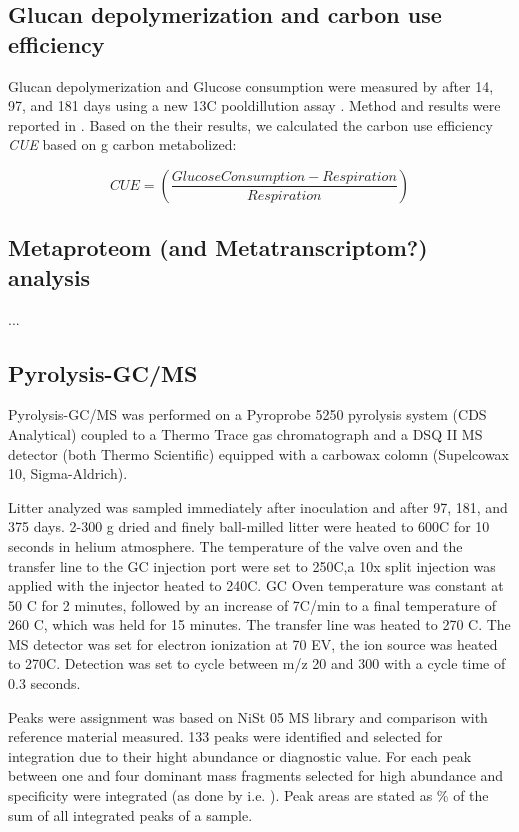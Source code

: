 \subsection{Glucan depolymerization and carbon use efficiency}
Glucan depolymerization and Glucose consumption were measured by \cite{Leitner2011} after 14, 97, and 181 days using a new 13C pooldillution assay . Method and results were reported in \cite{Leitner2011}. Based on the their results, we calculated the carbon use efficiency \emph{CUE} based on g carbon metabolized:

\begin{equation}
CUE = (\frac{Glucose Consumption - Respiration}{Respiration})
\end{equation}

\subsection{Metaproteom (and Metatranscriptom?) analysis}
...

\subsection{Pyrolysis-GC/MS}
Pyrolysis-GC/MS was performed on a Pyroprobe 5250 pyrolysis system (CDS Analytical) coupled to a Thermo Trace gas chromatograph and a DSQ II MS detector (both Thermo Scientific) equipped with a carbowax colomn (Supelcowax 10, Sigma-Aldrich).

Litter analyzed was sampled immediately after inoculation and after 97, 181, and 375 days. 2-300 \textmu g dried and finely ball-milled litter were heated to 600\textdegree C for 10 seconds in helium atmosphere. The temperature of the valve oven and the transfer line to the GC injection port were set to 250\textdegree C,a 10x split injection was applied with the injector heated to 240\textdegree C. GC Oven temperature was constant at 50 \textdegree C for 2 minutes, followed by an increase of 7\textdegree C/min to a final temperature of 260 \textdegree C, which was held for 15 minutes. The transfer line was heated to 270 \textdegree C. The MS detector was set for electron ionization at 70 EV, the ion source was heated to 270\textdegree C. Detection was set to cycle between m/z 20 and 300 with a cycle time of 0.3 seconds.

Peaks were assignment was based on NiSt 05 MS library and comparison with reference material measured. 133 peaks were identified and selected for integration due to their hight abundance or diagnostic value. For each peak between one and four dominant mass fragments selected for high abundance and specificity were integrated (as done by i.e. \cite{Schellekens2009}). Peak areas are stated as \% of the sum of all integrated peaks of a sample. 

